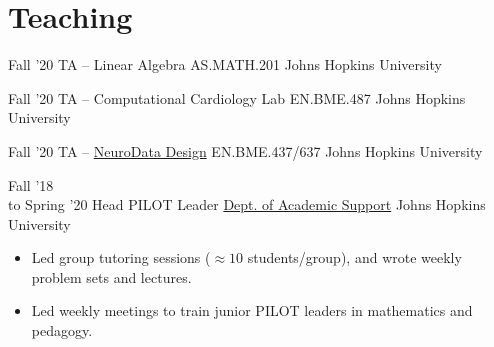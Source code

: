 \section{Teaching}

\cventry
{Fall '20}
{TA -- Linear Algebra}
{AS.MATH.201}
{Johns Hopkins University}
{}
{}

\cventry
{Fall '20}
{TA -- Computational Cardiology Lab}
{EN.BME.487}
{Johns Hopkins University}
{}
{}

\cventry
{Fall '20}
{TA -- \href{http://neurodatadesign.io}{NeuroData Design}}
{EN.BME.437/637}
{Johns Hopkins University}
{}
{}

\cventry
{Fall '18 \\to Spring '20}
{Head PILOT Leader}
{\href{https://academicsupport.jhu.edu/pilot/}{Dept. of Academic Support}}
{Johns Hopkins University}
{}
{
\begin{itemize}
    \item Led group tutoring sessions ($\approx 10$ students/group), and wrote weekly problem sets and lectures.
    \item Led weekly meetings to train junior PILOT leaders in mathematics and pedagogy.
\end{itemize}
}